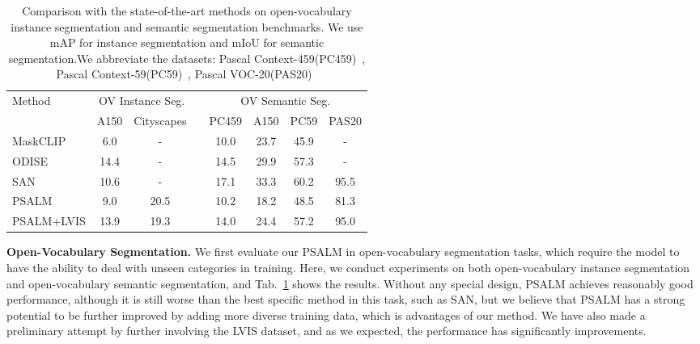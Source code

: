 \begin{table}[h!]
\centering
\footnotesize
\caption{Comparison with the state-of-the-art methods on open-vocabulary instance segmentation and semantic segmentation benchmarks. We use mAP for instance segmentation and mIoU for semantic segmentation.We abbreviate the datasets: Pascal Context-459(PC459)~\cite{pc}, Pascal Context-59(PC59)~\cite{pc}, Pascal VOC-20(PAS20)~\cite{pascal-voc-2010}}
\scalebox{0.85} {
\begin{tabular}{lccccccc}
\toprule
\multirow{2}{*}{Method} & \multicolumn{2}{c}{OV Instance Seg.} &  & \multicolumn{4}{c}{OV Semantic Seg.} \\ \cmidrule{2-3} \cmidrule{5-8} 
                        & A150          & Cityscapes         &  & PC459   & A150  & PC59  & PAS20  \\ \midrule
MaskCLIP~\cite{maskclip}               & 6.0             & -                  &  & 10.0     & 23.7   & 45.9   & -       \\
ODISE~\cite{odise}                   & 14.4            & -                  &  & 14.5     & 29.9   & 57.3   & -       \\
SAN~\cite{SAN}                     & 10.6            & -                  &  & 17.1     & 33.3   & 60.2   & 95.5    \\ \midrule
PSALM                   & 9.0             & 20.5               &  & 10.2     & 18.2   & 48.5   & 81.3    \\
PSALM+LVIS              & 13.9            & 19.3               &  & 14.0     & 24.4   & 57.2   & 95.0    \\ \bottomrule
\end{tabular}
}
\label{tab:ov_system}
\end{table}

\noindent\textbf{Open-Vocabulary Segmentation.} 
We first evaluate our PSALM in open-vocabulary segmentation tasks, which require the model to have the ability to deal with unseen categories in training. Here, we conduct experiments on both open-vocabulary instance segmentation and open-vocabulary semantic segmentation, and Tab.~\ref{tab:ov_system} shows the results. Without any special design, PSALM achieves reasonably good performance, although it is still worse than the best specific method in this task, such as SAN, but we believe that PSALM has a strong potential to be further improved by adding more diverse training data, which is advantages of our method. We have also made a preliminary attempt by further involving the LVIS dataset, and as we expected, the performance has significantly improvements.

